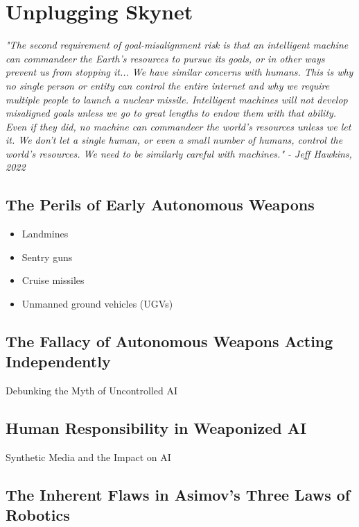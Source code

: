 \setchapterpreamble[u]{\margintoc}
\chapter{Unplugging Skynet}

\textit{"The second requirement of goal-misalignment risk is that an intelligent machine can commandeer the Earth's resources to pursue its goals, or in other ways prevent us from stopping it... We have similar concerns with humans. This is why no single person or entity can control the entire internet and why we require multiple people to launch a nuclear missile. Intelligent machines will not develop misaligned goals unless we go to great lengths to endow them with that ability. Even if they did, no machine can commandeer the world's resources unless we let it. We don't let a single human, or even a small number of humans, control the world's resources. We need to be similarly careful with machines." - Jeff Hawkins, 2022 \cite{hawkins2022}}

\section{The Perils of Early Autonomous Weapons}
\begin{itemize}
\item Landmines
\item Sentry guns
\item Cruise missiles
\item Unmanned ground vehicles (UGVs)
\end{itemize}

\section{The Fallacy of Autonomous Weapons Acting Independently}

Debunking the Myth of Uncontrolled AI

\section{Human Responsibility in Weaponized AI}

Synthetic Media and the Impact on AI \cite{syntheticmedia}

\section{The Inherent Flaws in Asimov's Three Laws of Robotics}

